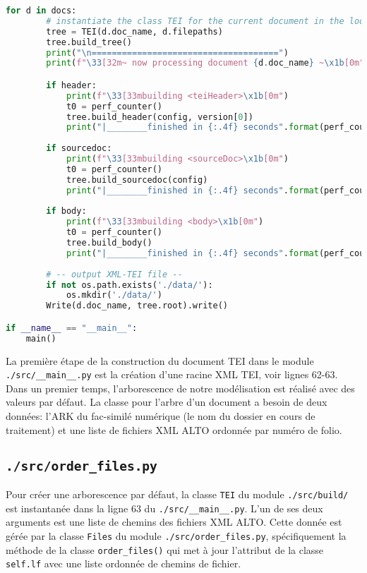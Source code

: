\documentclass[class=article, crop=false]{standalone}
\begin{document}
\begin{lstlisting}[language=python, style=python]
    for d in docs:
        # instantiate the class TEI for the current document in the loop
        tree = TEI(d.doc_name, d.filepaths)
        tree.build_tree()
        print("\n=====================================")
        print(f"\33[32m~ now processing document {d.doc_name} ~\x1b[0m")

        if header:
            print(f"\33[33mbuilding <teiHeader>\x1b[0m")
            t0 = perf_counter()
            tree.build_header(config, version[0])
            print("|________finished in {:.4f} seconds".format(perf_counter() - t0))
        
        if sourcedoc:
            print(f"\33[33mbuilding <sourceDoc>\x1b[0m")
            t0 = perf_counter()
            tree.build_sourcedoc(config)
            print("|________finished in {:.4f} seconds".format(perf_counter() - t0))
        
        if body:
            print(f"\33[33mbuilding <body>\x1b[0m")
            t0 = perf_counter()
            tree.build_body()
            print("|________finished in {:.4f} seconds".format(perf_counter() - t0))
    
        # -- output XML-TEI file --
        if not os.path.exists('./data/'):
            os.mkdir('./data/')
        Write(d.doc_name, tree.root).write()

if __name__ == "__main__":
    main()
\end{lstlisting}

\noindent La première étape de la construction du document \acrshort{TEI} dans le module \texttt{./src/\_\_main\_\_.py} est la création d'une racine \acrshort{XML} \acrshort{TEI}, voir lignes 62-63. Dans un premier temps, l'arborescence de notre modélisation est réalisé avec des valeurs par défaut. La classe pour l'arbre d'un document a besoin de deux données: l'\acrshort{ARK} du fac-similé numérique (le nom du dossier en cours de traitement) et une liste de fichiers \acrshort{XML} \acrshort{ALTO} ordonnée par numéro de folio.

\subsection{\texttt{./src/order\_files.py}}
Pour créer une arborescence par défaut, la classe \texttt{TEI} du module \texttt{./src/build/} est instantanée dans la ligne 63 du  \texttt{./src/\_\_main\_\_.py}. L'un de ses deux arguments est une liste de chemins des fichiers \acrshort{XML} \acrshort{ALTO}. Cette donnée est gérée par la classe \texttt{Files} du module \texttt{./src/order\_files.py}, spécifiquement la méthode de la classe \texttt{order\_files()} qui met à jour l'attribut de la classe \texttt{self.lf} avec une liste ordonnée de chemins de fichier.
\end{document}
